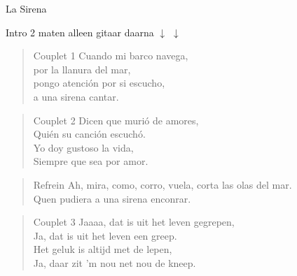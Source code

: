 \begin{song}[vals]{La Sirena}

\begin{instrumental}{Intro}
2 maten alleen gitaar  daarna
 \measure{}\measure{} 
  \measure{}\measure{} 
 \measure{}\measure{} 
     $\downarrow$ $\downarrow$
\end{instrumental}

\begin{verse}{Couplet 1}
Cuando mi barco navega,\\ 
por la llanura del mar,\\ 
\chord{}pongo atención por si escucho,\\ 
a una sirena cantar.\\ 
\end{verse}

\begin{verse}{Couplet 2}
Dicen que murió de amores,\\ 
Quién su canción escuchó. \\
\chord{}Yo doy gustoso la vida, \\
Siempre que sea por amor. \\
\end{verse}

\begin{verse}{Refrein}
Ah, mira, como,  corro, vuela, corta las olas del mar.\\
Quen pudiera a una sirena enconrar.
\end{verse}

\begin{verse}{Couplet 3}
Jaaaa, dat is uit het leven gegrepen,\\
Ja, dat is uit het leven een greep.\hspace{1.5em}\\
Het geluk is altijd met de lepen,\\
Ja, daar zit 'm nou net nou de kneep.\hspace{1.5em}
\end{verse}


\end{song}

